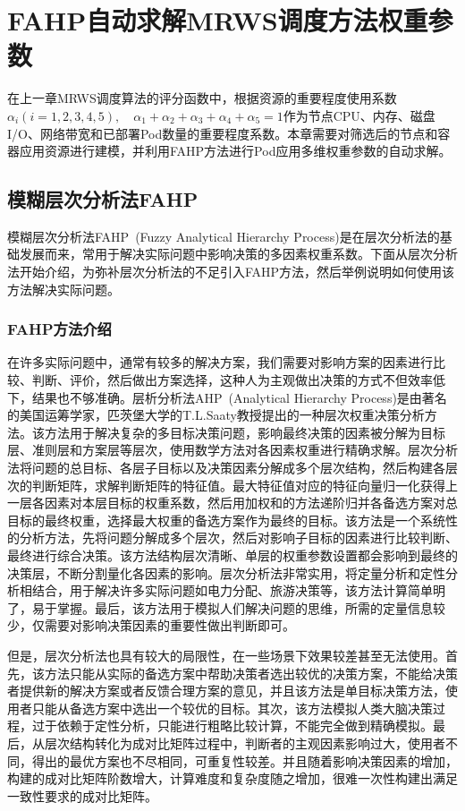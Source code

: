 \chapter{FAHP自动求解MRWS调度方法权重参数}
在上一章MRWS调度算法的评分函数中，根据资源的重要程度使用系数$\alpha_{i}(i=1,2,3,4,5), \quad\alpha_{1}+\alpha_{2}+\alpha_{3}+\alpha_{4}+\alpha_{5}=1$作为节点CPU、内存、磁盘I/O、网络带宽和已部署Pod数量的重要程度系数。本章需要对筛选后的节点和容器应用资源进行建模，并利用FAHP方法进行Pod应用多维权重参数的自动求解。

\section{模糊层次分析法FAHP}
模糊层次分析法FAHP~\cite{Kwong2002A,Hong2013Cloud}(Fuzzy Analytical Hierarchy Process)是在层次分析法的基础发展而来，常用于解决实际问题中影响决策的多因素权重系数。下面从层次分析法开始介绍，为弥补层次分析法的不足引入FAHP方法，然后举例说明如何使用该方法解决实际问题。

\subsection{FAHP方法介绍}
在许多实际问题中，通常有较多的解决方案，我们需要对影响方案的因素进行比较、判断、评价，然后做出方案选择，这种人为主观做出决策的方式不但效率低下，结果也不够准确。层析分析法AHP~\cite{Saaty1994How,Deng2012}(Analytical Hierarchy Process)是由著名的美国运筹学家，匹茨堡大学的T.L.Saaty教授提出的一种层次权重决策分析方法。该方法用于解决复杂的多目标决策问题，影响最终决策的因素被分解为目标层、准则层和方案层等层次，使用数学方法对各因素权重进行精确求解。层次分析法将问题的总目标、各层子目标以及决策因素分解成多个层次结构，然后构建各层次的判断矩阵，求解判断矩阵的特征值。最大特征值对应的特征向量归一化获得上一层各因素对本层目标的权重系数，然后用加权和的方法递阶归并各备选方案对总目标的最终权重，选择最大权重的备选方案作为最终的目标。该方法是一个系统性的分析方法，先将问题分解成多个层次，然后对影响子目标的因素进行比较判断、最终进行综合决策。该方法结构层次清晰、单层的权重参数设置都会影响到最终的决策层，不断分割量化各因素的影响。层次分析法非常实用，将定量分析和定性分析相结合，用于解决许多实际问题如电力分配、旅游决策等，该方法计算简单明了，易于掌握。最后，该方法用于模拟人们解决问题的思维，所需的定量信息较少，仅需要对影响决策因素的重要性做出判断即可。

但是，层次分析法也具有较大的局限性，在一些场景下效果较差甚至无法使用。首先，该方法只能从实际的备选方案中帮助决策者选出较优的决策方案，不能给决策者提供新的解决方案或者反馈合理方案的意见，并且该方法是单目标决策方法，使用者只能从备选方案中选出一个较优的目标。其次，该方法模拟人类大脑决策过程，过于依赖于定性分析，只能进行粗略比较计算，不能完全做到精确模拟。最后，从层次结构转化为成对比矩阵过程中，判断者的主观因素影响过大，使用者不同，得出的最优方案也不尽相同，可重复性较差。并且随着影响决策因素的增加，构建的成对比矩阵阶数增大，计算难度和复杂度随之增加，很难一次性构建出满足一致性要求的成对比矩阵。


